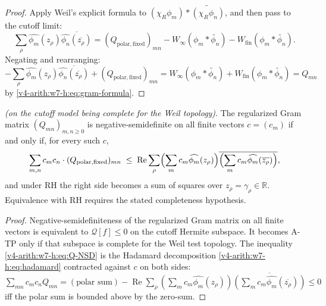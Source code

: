 \begin{proof}
Apply Weil's explicit formula 
to \((\chi_R\phi_{m})*\widetilde{(\chi_R\phi_{n})}\), and then pass
to the cutoff limit:
\[
\sum_{\rho}\widehat{\phi_{m}}(z_{\rho})
\overline{\widehat{\phi_{n}}(\overline{z_{\rho}})}
=(Q_{\mathrm{polar,fixed}})_{mn}-W_{\infty}(\phi_{m}*\widetilde{\phi_{n}})-W_{\mathrm{fin}}(\phi_{m}*\widetilde{\phi_{n}}).
\]
Negating and rearranging:
\[
-\!\sum_{\rho}\widehat{\phi_{m}}(z_{\rho})
\overline{\widehat{\phi_{n}}(\overline{z_{\rho}})}
+(Q_{\mathrm{polar,fixed}})_{mn}
=W_{\infty}(\phi_{m}*\widetilde{\phi_{n}})+W_{\mathrm{fin}}(\phi_{m}*\widetilde{\phi_{n}})
=Q_{mn}
\]
by \eqref{v4-arith:w7-h:eq:gram-formula}.
\end{proof}

\begin{corollary}
\label{v4-arith:w7-h:cor:RH-equivalence}
\ClaimStatusProvedHereConditional \emph{(on the cutoff model being
complete for the Weil topology)}. The regularized Gram matrix
\((Q_{mn})_{m,n\geq 0}\) is negative-semidefinite on all finite vectors
\(c=(c_{m})\) if and only if, for every such \(c\),
\begin{equation}
\label{v4-arith:w7-h:eq:Q-NSD}
\sum_{m,n}c_{m}c_{n}\cdot(Q_{\mathrm{polar,fixed}})_{mn}\;\leq\;
\operatorname{Re}\sum_{\rho}\Bigl(\sum_{m}c_{m}\widehat{\phi_{m}}(z_{\rho})\Bigr)
\overline{\Bigl(\sum_{m}c_{m}\widehat{\phi_{m}}(\overline{z_{\rho}})\Bigr)},
\end{equation}
and under RH the right side becomes a sum of squares over
\(z_{\rho}=\gamma_{\rho}\in\mathbb R\). Equivalence with RH requires
the stated completeness hypothesis.
\end{corollary}

\begin{proof}
Negative-semidefiniteness of the regularized Gram matrix on all finite
vectors is equivalent to \(\mathcal{Q}[f]\leq0\) on the cutoff Hermite
subspace. It becomes A-TP only if that subspace is complete for the
Weil test topology.
The inequality \eqref{v4-arith:w7-h:eq:Q-NSD} is the Hadamard
decomposition \eqref{v4-arith:w7-h:eq:hadamard} contracted against
\(c\) on both sides: \(\sum_{mn}c_m c_n Q_{mn} = (\text{polar sum}) -
\operatorname{Re}\sum_\rho(\sum_m c_m \widehat{\phi_m}(z_\rho))
\overline{(\sum_m c_m \widehat{\phi_m}(\overline{z_\rho}))}\leq 0\) iff
the polar sum is bounded above by the zero-sum.
\end{proof}

